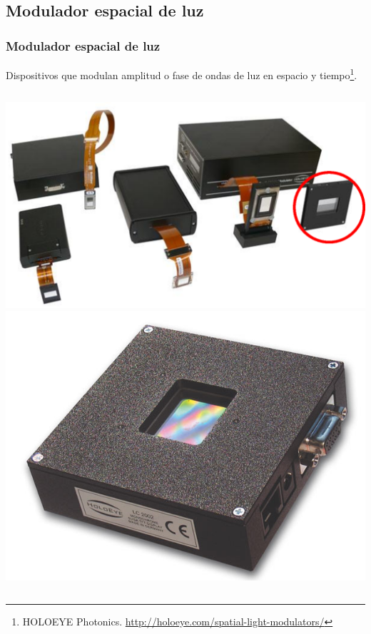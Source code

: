 \documentclass[serif,8pt]{beamer}
\begin{document}
		\subsection{Modulador espacial de luz}
		\begin{frame}
		\frametitle{Modulador espacial de luz}
		Dispositivos que modulan amplitud o fase de ondas de luz en espacio y tiempo\footnote{HOLOEYE Photonics. \url{http://holoeye.com/spatial-light-modulators/}}.
		

		\begin{columns}
		\centering
		\includegraphics[scale=0.4]{img/Mod.eps}
		\centering
		\includegraphics[scale=0.15]{img/lc2002.jpg}

\end{columns}
\end{frame}
\end{document}
